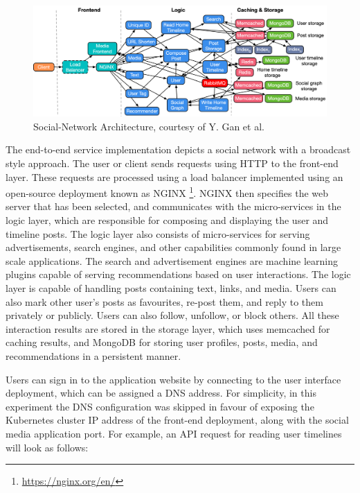 \begin{figure}[htb]
    \centering
    \caption{Social-Network Architecture, courtesy of Y. Gan et al. \cite{gan2019open}}
    \label{fig:social-network-arch}
    \includegraphics[width=1.0\linewidth]{Figures/Social-Network-Architecture.pdf}
\end{figure}

The end-to-end service implementation depicts a social network with a broadcast style approach. The user or client sends requests using HTTP to the front-end layer. These requests are processed using a load balancer implemented using an open-source deployment known as NGINX \footnote{\url{https://nginx.org/en/}}. NGINX then specifies the web server that has been selected, and communicates with the micro-services in the logic layer, which are responsible for composing and displaying the user and timeline posts. The logic layer also consists of micro-services for serving advertisements, search engines, and other capabilities commonly found in large scale applications. The search and advertisement engines are machine learning plugins capable of serving recommendations based on user interactions. The logic layer is capable of handling posts containing text, links, and media. Users can also mark other user's posts as favourites, re-post them, and reply to them privately or publicly. Users can also follow, unfollow, or block others. All these interaction results are stored in the storage layer, which uses memcached for caching results, and MongoDB for storing user profiles, posts, media, and recommendations in a persistent manner.

Users can sign in to the application website by connecting to the user interface deployment, which can be assigned a DNS address. For simplicity, in this experiment the DNS configuration was skipped in favour of exposing the Kubernetes cluster IP address of the front-end deployment, along with the social media application port. For example, an API request for reading user timelines will look as follows:\par

